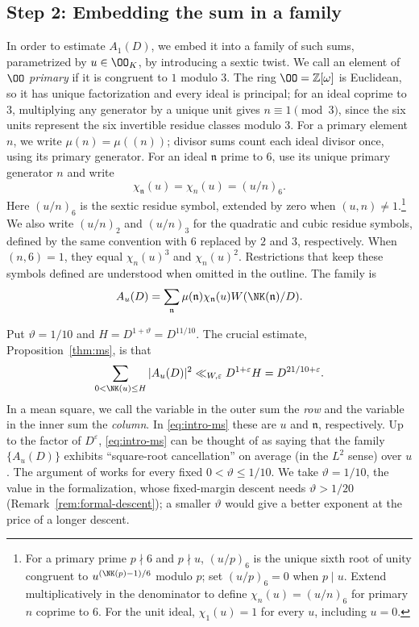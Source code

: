 \subsection{Step 2: Embedding the sum in a family}

In order to estimate $A_1(D)$, we embed it into a family of such sums,
parametrized by $u\in\OO_K$, by introducing a sextic twist.
We call an element of $\OO$ \emph{primary} if it is congruent to $1$
modulo $3$. The ring $\OO=\mathbb Z[\omega]$ is Euclidean, so it has unique
factorization and every ideal is principal; for an ideal coprime to $3$,
multiplying any generator by a unique unit gives $n\equiv1\pmod3$,
since the six units represent the six invertible residue classes modulo $3$.
For a primary element $n$, we write $\mu(n)=\mu((n))$;
divisor sums count each ideal divisor once, using its primary generator.
For an ideal $\mathfrak n$ prime to $6$, use its unique primary generator
$n$ and write
\[
 \chi_{\mathfrak n}(u)=\chi_n(u)=(u/n)_6.
\]
Here $(u/n)_6$ is the sextic residue symbol, extended by zero
when $(u,n)\neq 1$.\footnote{For a primary prime $p\nmid6$ and $p\nmid u$,
$(u/p)_6$ is the unique sixth root of unity congruent to
$u^{(\NK(p)-1)/6}$ modulo $p$; set $(u/p)_6=0$ when $p\mid u$.
Extend multiplicatively in the denominator to define
$\chi_n(u)=(u/n)_6$ for primary $n$ coprime to $6$.
For the unit ideal, $\chi_1(u)=1$ for every $u$, including $u=0$.
}
We also write $(u/n)_2$ and $(u/n)_3$ for the quadratic and cubic residue symbols, defined by the same convention with $6$ replaced by $2$ and $3$, respectively. When $(n,6)=1$, they equal $\chi_n(u)^3$ and $\chi_n(u)^2$. Restrictions that keep these symbols defined are understood when omitted in the outline.
The family is
\begin{equation}\label{eq:intro-family}
 A_u(D)=\sum_{\mathfrak n}
   \mu(\mathfrak n)\chi_{\mathfrak n}(u)
   W(\NK(\mathfrak n)/D).
\end{equation}

Put $\vartheta=1/10$ and $H=D^{1+\vartheta}=D^{11/10}$. The crucial estimate,
Proposition~\ref{thm:ms}, is that
\begin{equation}\label{eq:intro-ms}
 \sum_{0<\NK(u)\le H}|A_u(D)|^2
       \ll_{W,\varepsilon}D^{1+\varepsilon}H=D^{21/10+\varepsilon}.
\end{equation}
In a mean square, we call the variable in the outer sum the \emph{row}
and the variable in the inner sum the \emph{column}. In
\eqref{eq:intro-ms} these are $u$ and $\mathfrak n$, respectively.
Up to the factor of $D^\varepsilon$, \eqref{eq:intro-ms} can be thought of as saying that the
family $\{A_u(D)\}$ exhibits ``square-root cancellation'' on average (in the $L^2$ sense) over
$u$. The argument of \cite{OpenAI26b} works for every fixed $0<\vartheta\le1/10$. We take
$\vartheta=1/10$, the value in the formalization, whose fixed-margin descent needs
$\vartheta>1/20$ (Remark~\ref{rem:formal-descent}); a smaller $\vartheta$ would give a better
exponent at the price of a longer descent.


